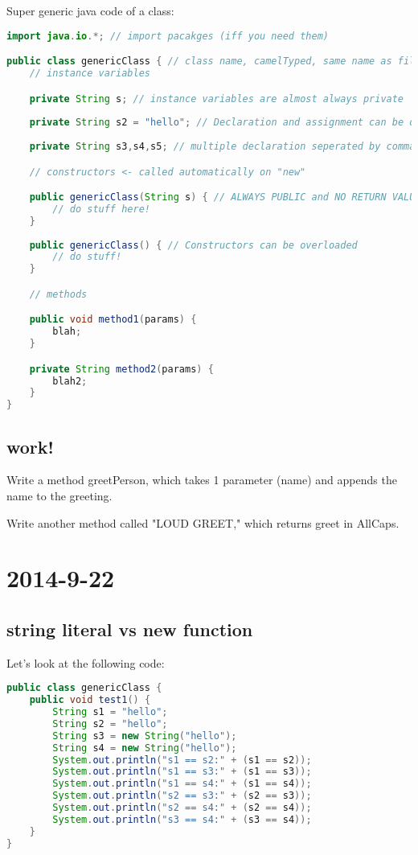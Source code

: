 \documentclass [12 pt, twoside] {article}
\begin{document}
Super generic java code of a class:
\begin{lstlisting}[language=Java]
import java.io.*; // import pacakges (iff you need them)

public class genericClass { // class name, camelTyped, same name as file
	// instance variables

	private String s; // instance variables are almost always private
	
	private String s2 = "hello"; // Declaration and assignment can be done at once
	
	private String s3,s4,s5; // multiple declaration seperated by commas

	// constructors <- called automatically on "new"

	public genericClass(String s) { // ALWAYS PUBLIC and NO RETURN VALUE
		// do stuff here!
	}
	
	public genericClass() { // Constructors can be overloaded
		// do stuff!
	}

	// methods

	public void method1(params) {
		blah;
	}

	private String method2(params) {
		blah2;
	}
}
\end{lstlisting}


\subsection{work!}


Write a method greetPerson, which takes 1 parameter (name) and appends the name to the greeting.


Write another method called "LOUD GREET," which returns greet in AllCaps.


\section{2014-9-22}
\subsection{string literal vs new function}


Let's look at the following code:
\begin{lstlisting}[language=Java]
public class genericClass {
	public void test1() {
		String s1 = "hello";
		String s2 = "hello";
		String s3 = new String("hello");
		String s4 = new String("hello");
		System.out.println("s1 == s2:" + (s1 == s2));
		System.out.println("s1 == s3:" + (s1 == s3));
		System.out.println("s1 == s4:" + (s1 == s4));
		System.out.println("s2 == s3:" + (s2 == s3));
		System.out.println("s2 == s4:" + (s2 == s4));
		System.out.println("s3 == s4:" + (s3 == s4));
	}
}
\end{lstlisting}
\end{document}
